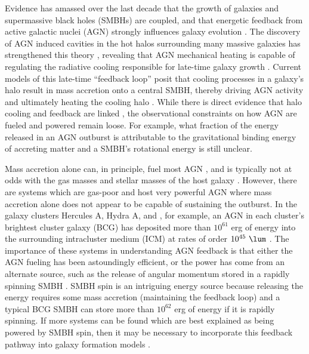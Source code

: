\documentclass[11pt, preprint]{aastex}
\begin{document}
Evidence has amassed over the last decade that the growth of galaxies
and supermassive black holes (SMBHs) are coupled, and that energetic
feedback from active galactic nuclei (AGN) strongly influences galaxy
evolution \citep[\eg][]{1995ARA&A..33..581K, magorrian,
  1998A&A...331L...1S, 2000MNRAS.311..576K, 2000ApJ...539L...9F,
  2000ApJ...539L..13G, 2002ApJ...574..740T}. The discovery of AGN
induced cavities in the hot halos surrounding many massive galaxies
has strengthened this theory \citep[see][for a review]{mcnamrev},
revealing that AGN mechanical heating is capable of regulating the
radiative cooling responsible for late-time galaxy growth
\citep[\eg][]{birzan04, dunn06, rafferty06}. Current models of this
late-time ``feedback loop'' posit that cooling processes in a galaxy's
halo result in mass accretion onto a central SMBH, thereby driving AGN
activity and ultimately heating the cooling halo
\citep[\eg][]{croton06, bower06, sijacki07}. While there is direct
evidence that halo cooling and feedback are linked
\citep[\eg][]{haradent, rafferty08}, the observational constraints on
how AGN are fueled and powered remain loose. For example, what
fraction of the energy released in an AGN outburst is attributable to
the gravitational binding energy of accreting matter \citep[see][for a
  review]{1984RvMP...56..255B} and a SMBH's rotational energy
\citep[see][for a review]{2002NewAR..46..247M} is still unclear.

Mass accretion alone can, in principle, fuel most AGN
\citep[\eg][]{pizzolato05, 2006MNRAS.372...21A}, and is typically not
at odds with the gas masses and stellar masses of the host galaxy
\citep[\eg][]{rafferty06}. However, there are systems which are
gas-poor and host very powerful AGN where mass accretion alone does
not appear to be capable of sustaining the outburst. In the galaxy
clusters Hercules A, Hydra A, and \ms, for example, an AGN in each
cluster's brightest cluster galaxy (BCG) has deposited more than
$10^{61}$ erg of energy into the surrounding intracluster medium (ICM)
at rates of order $10^{45} ~\lum$ \citep{herca, hydraa, ms0735}. The
importance of these systems in understanding AGN feedback is that
either the AGN fueling has been astoundingly efficient, or the power
has come from an alternate source, such as the release of angular
momentum stored in a rapidly spinning SMBH \citep[\eg][]{msspin,
  minaspin}. SMBH spin is an intriguing energy source because
releasing the energy requires some mass accretion (maintaining the
feedback loop) and a typical BCG SMBH can store more than $10^{62}$
erg of energy if it is rapidly spinning. If more systems can be found
which are best explained as being powered by SMBH spin, then it may be
necessary to incorporate this feedback pathway into galaxy formation
models \citep[\eg][]{2003ApJ...585L.101H, 2007ApJ...658..815S,
  2009MNRAS.397.1302B, gesspin}.
\end{document}
